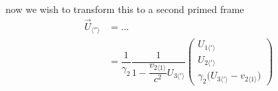 now we wish to transform this to a second primed frame
\begin{equation}%
    \begin{split}
    \vec{U}_{\langle '' \rangle} 
    &= ... \\
    &= \dfrac{1}{\gamma_2} \dfrac{1}{1-\dfrac{v_{2\langle 1 \rangle}}{c^2}U_{3\langle'\rangle}} \begin{pmatrix}
    U_{1\langle'\rangle}\\ U_{2\langle'\rangle}\\ \gamma_2\Big(U_{3\langle'\rangle} - v_{2\langle 1 \rangle} \Big)
    \end{pmatrix} 
    \end{split}
\end{equation}%

